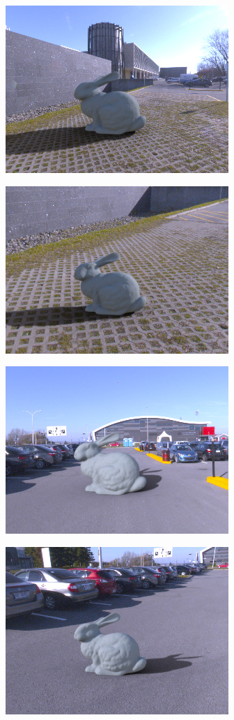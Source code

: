 \begin{minipage}{\linewidth}
\begin{multicols}{4}
\includegraphics[width=\mywidth]{AG8A2917_Panorama_hdr-corrected_002.jpg}

\includegraphics[width=\mywidth]{AG8A2917_Panorama_hdr-corrected_004.jpg}

\includegraphics[width=\mywidth]{AG8A2959_Panorama_hdr-corrected_004.jpg}

\includegraphics[width=\mywidth]{AG8A2959_Panorama_hdr-corrected_010.jpg}


\end{multicols}
\end{minipage}
